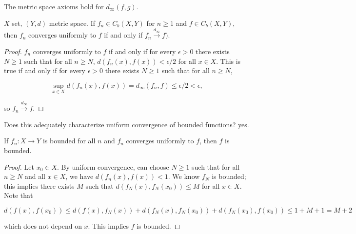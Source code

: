 \begin{exercise}

The metric space axioms hold for \(d_\infty(f, g)\).

\end{exercise}

\begin{theorem}

\(X\) set, \((Y,d)\) metric space. If \(f_n \in C_b(X, Y)\) for \(n \geq 1\) and \(f \in C_b(X, Y)\), then \(f_n\) converges uniformly to \(f\) if and only if \(f_n \xrightarrow{d_\infty} f)\). 

\end{theorem}

\begin{proof}

\(f_n\) converges uniformly to \(f\) if and only if for every \(\epsilon > 0\) there exists \(N \geq 1\) such that for all \(n \geq N\), \(d(f_n(x), f(x)) < \epsilon/2\) for all \(x \in X\). This is true if and only if for every \(\epsilon > 0\) there exists \(N \geq 1\) such that for all \(n \geq N\), 

\[
\sup_{x \in X} d(f_n(x), f(x)) = d_\infty(f_n, f) \leq \epsilon/2 < \epsilon,
\]

so \(f_n \xrightarrow{d_\infty} f\).

\end{proof}

Does this adequately characterize uniform convergence of bounded functions? yes.

\begin{proposition}

If \(f_n: X \to Y\) is bounded for all \(n\) and \(f_n\) converges uniformly to \(f\), then \(f\) is bounded.

\end{proposition}

\begin{proof}

Let \(x_0 \in X\). By uniform convergence, can choose \(N \geq 1\) such that for all \(n \geq N\) and all \(x \in X\), we have \(d(f_n(x), f(x)) < 1\). We know \(f_N\) is bounded; this implies there exists \(M\) such that \(d(f_N(x), f_N(x_0)) \leq M\) for all \(x \in X\). Note that

\[
d(f(x), f(x_0)) \leq d(f(x), f_N(x)) + d(f_N(x), f_N(x_0)) + d(f_N(x_0), f(x_0)) \leq 1 + M + 1 = M + 2
\]

which does not depend on \(x\). This implies \(f\) is bounded.

\end{proof}

